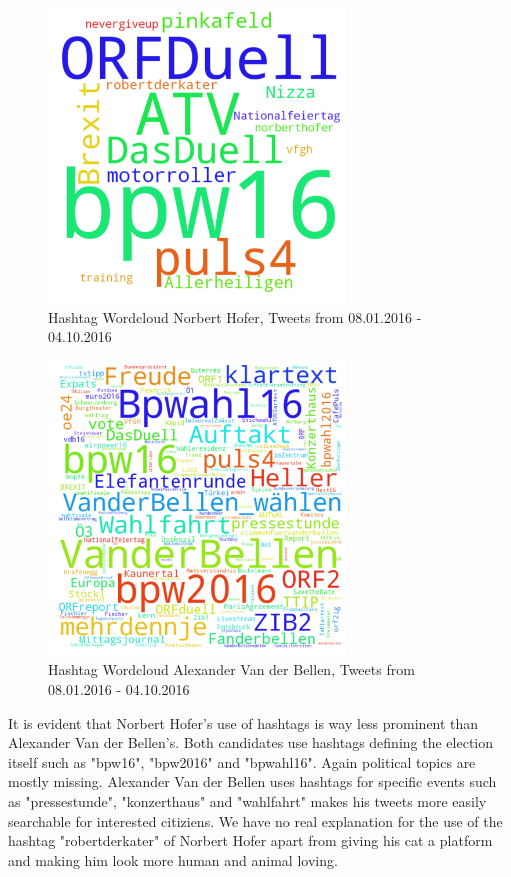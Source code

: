 \documentclass{llncs}
\begin{document}
\begin{figure}[htbp] 
	\centering
	\includegraphics[width=0.7\textwidth]{grafics/wordcloud_hofer_hashtags.png}
	\caption{Hashtag Wordcloud Norbert Hofer, Tweets from 08.01.2016 - 04.10.2016}
	\label{fig:Wordcloud Norbert Hofer Hashtags}
\end{figure}
\begin{figure}[htbp] 
	\centering
	\includegraphics[width=0.7\textwidth]{grafics/wordcloud_vdb_hashtags.png}
	\caption{Hashtag Wordcloud Alexander Van der Bellen, Tweets from 08.01.2016 - 04.10.2016}
	\label{fig:Wordcloud Alexander Van der Bellen Hashtags}
\end{figure}
It is evident that Norbert Hofer's use of hashtags is way less prominent than Alexander Van der Bellen's. Both candidates use hashtags defining the election itself such as "bpw16", "bpw2016" and "bpwahl16". Again political topics are mostly missing. Alexander Van der Bellen uses hashtags for specific events such as "pressestunde", "konzerthaus" and "wahlfahrt" makes his tweets more easily searchable for interested citiziens. We have no real explanation for the use of the hashtag "robertderkater" of Norbert Hofer apart from giving his cat a platform and making him look more human and animal loving. 
\newpage
\end{document}
